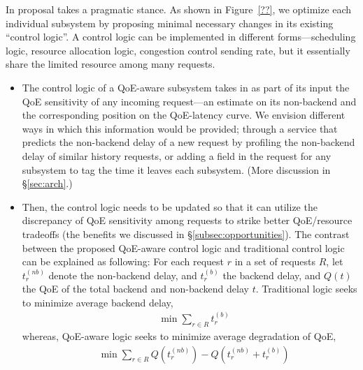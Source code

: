 In proposal takes a pragmatic stance. 
As shown in Figure~\ref{??}, we optimize each individual subsystem by proposing minimal necessary changes in its existing ``control logic''.
A control logic can be implemented in different forms---\eg scheduling logic, resource allocation logic, congestion control sending rate, but it essentially share the limited resource among many requests.
\begin{itemize}
    \item The control logic of a QoE-aware subsystem takes in as part of its input the QoE sensitivity of any incoming request---an estimate on its non-backend and the corresponding position on the QoE-latency curve. 
    We envision different ways in which this information would be provided; \eg through a service that predicts the non-backend delay of a new request by profiling the non-backend delay of similar history requests, or adding a field in the request for any subsystem to tag the time it leaves each subsystem. (More discussion in \S\ref{sec:arch}.)
    \item Then, the control logic needs to be updated so that it can utilize the discrepancy of QoE sensitivity among requests to strike better QoE/resource tradeoffs (\ie the benefits we discussed in \S\ref{subsec:opportunities}).
    The contrast between the proposed QoE-aware control logic and traditional control logic can be explained as following: 
    For each request $r$ in a set of requests $R$, let $t_{r}^{(nb)}$ denote the non-backend delay, and $t_{r}^{(b)}$ the backend delay, and $Q(t)$ the QoE of the total backend and non-backend delay $t$.
    Traditional logic seeks to minimize average backend delay, \ie
    \begin{align}
        & \min \sum_{r\in R} t_{r}^{(b)} \label{eq:old}
    \end{align}
    whereas, QoE-aware logic seeks to minimize average degradation of QoE, \ie
    \begin{align}
        & \min \sum_{r\in R} Q(t_{r}^{(nb)})-Q(t_{r}^{(nb)}+t_{r}^{(b)}) \label{eq:new}
    \end{align}
\end{itemize}

